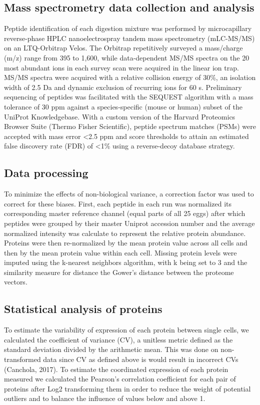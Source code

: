 \subsection{Mass spectrometry data collection and analysis}

Peptide identification of each digestion mixture was performed by microcapillary reverse-phase HPLC nanoelectrospray tandem mass spectrometry (mLC-MS/MS) on an LTQ-Orbitrap Velos. The Orbitrap repetitively surveyed a mass/charge (m/z) range from 395 to 1,600, while data-dependent MS/MS spectra on the 20 most abundant ions in each survey scan were acquired in the linear ion trap. MS/MS spectra were acquired with a relative collision energy of 30\%, an isolation width of 2.5 Da and dynamic exclusion of recurring ions for 60 s. Preliminary sequencing of peptides was facilitated with the SEQUEST algorithm with a mass tolerance of 30 ppm against a species-specific (mouse or human) subset of the UniProt Knowledgebase. With a custom version of the Harvard Proteomics Browser Suite (Thermo Fisher Scientific), peptide spectrum matches (PSMs) were accepted with mass error <2.5 ppm and score thresholds to attain an estimated false discovery rate (FDR) of <1\% using a reverse-decoy database strategy.

\subsection{Data processing}

To minimize the effects of non-biological variance, a correction factor was used to correct for these biases. First, each peptide in each run was normalized its corresponding master reference channel (equal parts of all 25 eggs) after which peptides were grouped by their master Uniprot accession number and the average normalized intensity was calculate to represent the relative protein abundance. Proteins were then re-normalized by the mean protein value across all cells and then by the mean protein value within each cell. Missing protein levels were imputed using the k-nearest neighbors algorithm, with k being set to 3 and the similarity measure for distance the Gower’s distance between the proteome vectors.

\subsection{Statistical analysis of proteins}

To estimate the variability of expression of each protein between single cells, we calculated the coefficient of variance (CV), a unitless metric defined as the standard deviation divided by the arithmetic mean. This was done on non-transformed data since CV as defined above is would result in incorrect CVs (Canchola, 2017). To estimate the coordinated expression of each protein measured we calculated the Pearson’s correlation coefficient for each pair of proteins after Log2 transforming them in order to reduce the weight of potential outliers and to balance the influence of values below and above 1.

